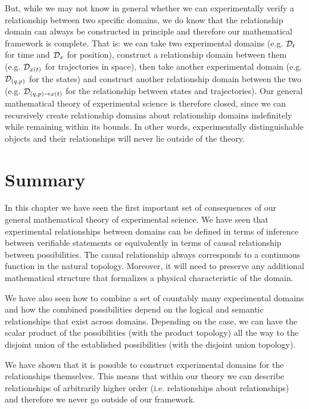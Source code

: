 \documentclass[11pt,letterpaper,fleqn]{memoir} %
\begin{document}
But, while we may not know in general whether we can experimentally verify a relationship between two specific domains, we do know that the relationship domain can always be constructed in principle and therefore our mathematical framework is complete. That is: we can take two experimental domains (e.g. $\mathcal{D}_t$ for time and $\mathcal{D}_x$ for position), construct a relationship domain between them (e.g. $\mathcal{D}_{x(t)}$ for trajectories in space), then take another experimental domain (e.g. $\mathcal{D}_{(q,p)}$ for the states) and construct another relationship domain between the two (e.g. $\mathcal{D}_{(q,p)\to x(t)}$ for the relationship between states and trajectories). Our general mathematical theory of experimental science is therefore closed, since we can recursively create relationship domains about relationship domains indefinitely while remaining within its bounds. In other words, experimentally distinguishable objects and their relationships will never lie outside of the theory.


\section{Summary}

In this chapter we have seen the first important set of consequences of our general mathematical theory of experimental science. We have seen that experimental relationships between domains can be defined in terms of inference between verifiable statements or equivalently in terms of causal relationship between possibilities. The causal relationship always corresponds to a continuous function in the natural topology. Moreover, it will need to preserve any additional mathematical structure that formalizes a physical characteristic of the domain.

We have also seen how to combine a set of countably many experimental domains and how the combined possibilities depend on the logical and semantic relationships that exist across domains. Depending on the case, we can have the scalar product of the possibilities (with the product topology) all the way to the disjoint union of the established possibilities (with the disjoint union topology).

We have shown that it is possible to construct experimental domains for the relationships themselves. This means that within our theory we can describe relationships of arbitrarily higher order (i.e. relationships about relationships) and therefore we never go outside of our framework.
\end{document}
